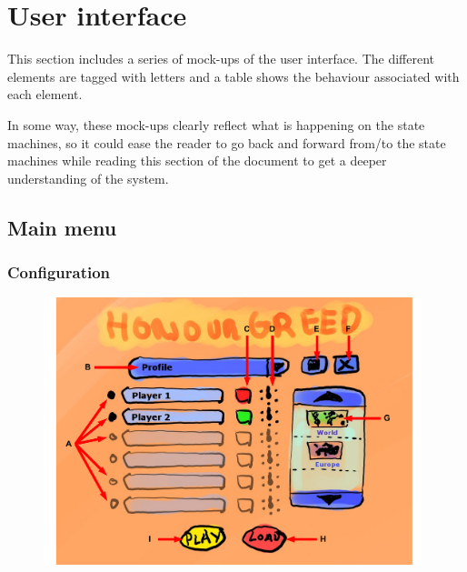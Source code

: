 \documentclass[12pt,a4paper]{article}
\let\stdsection\section
\renewcommand\section{\newpage\stdsection}
\begin{document}
\section{User interface}

This section includes a series of mock-ups of the user interface. The
different elements are tagged with letters and a table shows the
behaviour associated with each element.

In some way, these mock-ups clearly reflect what is happening on the
state machines, so it could ease the reader to go back and forward
from/to the state machines while reading this section of the document
to get a deeper understanding of the system.

\newpage
\subsection{Main menu}\label{mock:71}

\subsubsection{Configuration}\label{mock:711}

\begin{figure}[H]
  \centering
  \includegraphics[width=11cm]{pic/mocks/1-1.pdf}
\end{figure}
\end{document}

